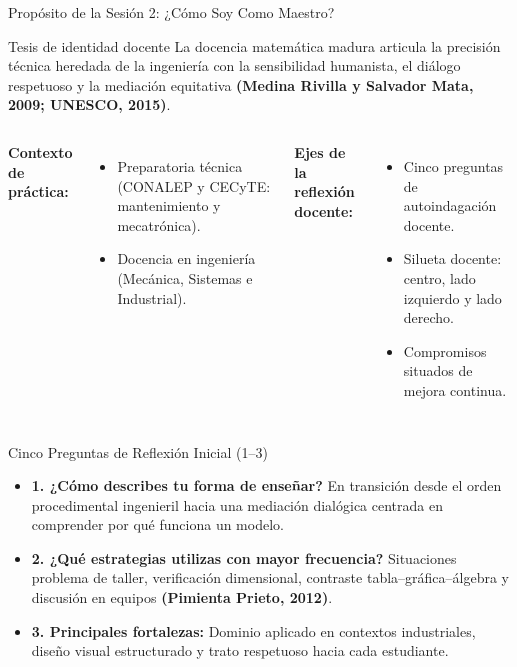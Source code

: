 \documentclass[aspectratio=169,spanish,xcolor=table]{beamer}
\begin{document}
\begin{frame}{Propósito de la Sesión 2: ¿Cómo Soy Como Maestro?}
  \begin{block}{Tesis de identidad docente}
    La docencia matemática madura articula la precisión técnica heredada de la ingeniería con la sensibilidad humanista, el diálogo respetuoso y la mediación equitativa \textbf{(Medina Rivilla y Salvador Mata, 2009; UNESCO, 2015)}.
  \end{block}
  \vspace{0.3cm}
  \begin{columns}[T]
      \textbf{\color{iiiepeNavy}Contexto de práctica:}
      \begin{itemize}\small
        \item Preparatoria técnica (CONALEP y CECyTE: mantenimiento y mecatrónica).
        \item Docencia en ingeniería (Mecánica, Sistemas e Industrial).
      \end{itemize}
      \textbf{\color{iiiepeBlue}Ejes de la reflexión docente:}
      \begin{itemize}\small
        \item Cinco preguntas de autoindagación docente.
        \item Silueta docente: centro, lado izquierdo y lado derecho.
        \item Compromisos situados de mejora continua.
      \end{itemize}
  \end{columns}
\end{frame}

\begin{frame}{Cinco Preguntas de Reflexión Inicial (1--3)}
  \begin{itemize}\small
    \item \textbf{\color{iiiepeNavy}1. ¿Cómo describes tu forma de enseñar?} En transición desde el orden procedimental ingenieril hacia una mediación dialógica centrada en comprender por qué funciona un modelo.
    \vspace{0.2cm}
    \item \textbf{\color{iiiepeBlue}2. ¿Qué estrategias utilizas con mayor frecuencia?} Situaciones problema de taller, verificación dimensional, contraste tabla--gráfica--álgebra y discusión en equipos \textbf{(Pimienta Prieto, 2012)}.
    \vspace{0.2cm}
    \item \textbf{\color{iiiepeAqua!75!black}3. Principales fortalezas:} Dominio aplicado en contextos industriales, diseño visual estructurado y trato respetuoso hacia cada estudiante.
  \end{itemize}
\end{frame}
\end{document}

